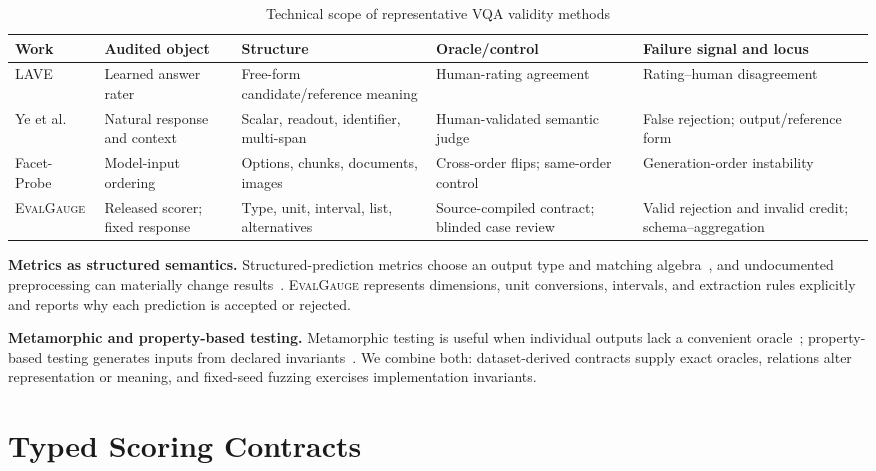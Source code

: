 \documentclass[a4paper]{llncs}
\newcommand{\tool}{\textsc{EvalGauge}}
\begin{document}
\begin{table}[t]
\centering
\small
\caption{Technical scope of representative VQA validity methods}
\label{tab:related-scope}
\setlength{\tabcolsep}{3.2pt}
\renewcommand{\arraystretch}{1.08}
\begin{tabular}{@{}>{\raggedright\arraybackslash}p{}>{\raggedright\arraybackslash}p{}>{\raggedright\arraybackslash}p{}>{\raggedright\arraybackslash}p{}>{\raggedright\arraybackslash}p{}@{}}
\toprule
Work & Audited object & Structure & Oracle/control & Failure signal and locus\\
\midrule
LAVE~\cite{manas2024lave} & Learned answer rater & Free-form candidate/reference meaning & Human-rating agreement & Rating--human disagreement\\
Ye et al.~\cite{ye2026vqascore} & Natural response and context & Scalar, readout, identifier, multi-span & Human-validated semantic judge & False rejection; output/reference form\\
Facet-Probe~\cite{paruchuri2026sameevidence} & Model-input ordering & Options, chunks, documents, images & Cross-order flips; same-order control & Generation-order instability\\
\tool{} & Released scorer; fixed response & Type, unit, interval, list, alternatives & Source-compiled contract; blinded case review & Valid rejection and invalid credit; schema--aggregation\\
\bottomrule
\end{tabular}
\end{table}

\textbf{Metrics as structured semantics.} Structured-prediction metrics choose an output type and matching algebra~\cite{chen2023unified}, and undocumented preprocessing can materially change results~\cite{chen2022reproducibility}. \tool{} represents dimensions, unit conversions, intervals, and extraction rules explicitly and reports why each prediction is accepted or rejected.

\textbf{Metamorphic and property-based testing.} Metamorphic testing is useful when individual outputs lack a convenient oracle~\cite{segura2016survey,chen2011metamorphic}; property-based testing generates inputs from declared invariants~\cite{claessen2000quickcheck}. We combine both: dataset-derived contracts supply exact oracles, relations alter representation or meaning, and fixed-seed fuzzing exercises implementation invariants.

\section{Typed Scoring Contracts}
\end{document}
